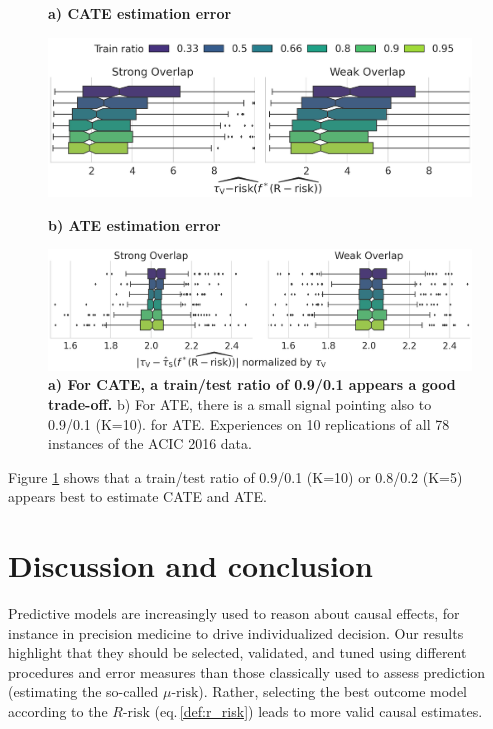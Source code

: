 \documentclass{report}
\begin{document}
\begin{figure}[!t]
  \begin{minipage}{.5\textwidth}
    \centerline{\textbf{a) CATE estimation error}}
    \includegraphics[width=\linewidth]{img/chapter_5/_5_train_size_evaluated_metric_r_risk__evaluation_validation_tau_risk__best_tau_norm__False_norm_False__acic16.png}
  \end{minipage}
  \begin{minipage}{.5\textwidth}
    \centerline{\textbf{b) ATE estimation error}}
    \includegraphics[width=\linewidth]{img/chapter_5/_5_train_size_evaluated_metric_r_risk__evaluation_validation_test_abs_bias_ate__best_tau_norm__False_norm_True__acic16.png}
  \end{minipage}%
  \caption{\textbf{a) For CATE, a train/test ratio of 0.9/0.1 appears a good
      trade-off.} b) For ATE, there is a small signal pointing also to
    0.9/0.1 (K=10).
    for ATE. Experiences on 10 replications of all 78 instances of the ACIC 2016
    data.}\label{fig:train_test_ratio}
\end{figure}

Figure \ref{fig:train_test_ratio} shows that a train/test ratio of
0.9/0.1 (K=10) or 0.8/0.2 (K=5) appears best to estimate CATE and
ATE.


\section{Discussion and conclusion}\label{sec:discussion}

Predictive models are increasingly used to reason about causal effects,
for instance in precision medicine to drive individualized decision.
Our results highlight that they should be selected, validated, and tuned
using different procedures and error measures than those classically used
to assess prediction (estimating the so-called $\mu\text{-risk}$).
Rather, selecting the best outcome model according to the $R\text{-risk}$
(eq.\,\ref{def:r_risk}) leads to more valid causal estimates.
\end{document}
